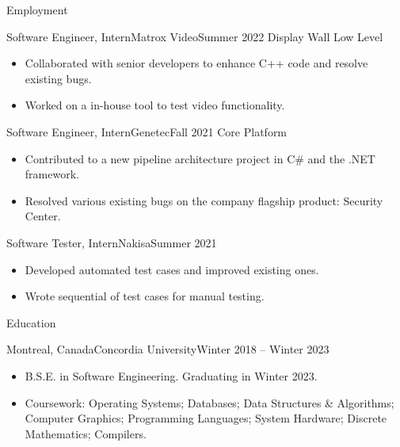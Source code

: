 \documentclass[]{mcdowellcv}
\begin{document}
	\makeheader
	
	\begin{cvsection}{Employment}
		\begin{cvsubsection}{Software Engineer, Intern}{Matrox Video}{Summer 2022}
		    Display Wall Low Level	
			\begin{itemize}
                \item Collaborated with senior developers to enhance C++ code and resolve existing bugs.
                \item Worked on a in-house tool to test video functionality.
			\end{itemize}
		\end{cvsubsection}
		
		\begin{cvsubsection}{Software Engineer, Intern}{Genetec}{Fall 2021}	
            Core Platform
			\begin{itemize}
                \item Contributed to a new pipeline architecture project in C\# and the .NET framework.
                \item Resolved various existing bugs on the company flagship product: Security Center.
			\end{itemize}
		\end{cvsubsection}
		
		\begin{cvsubsection}{Software Tester, Intern}{Nakisa}{Summer 2021}		
			\begin{itemize}
                \item Developed automated test cases and improved existing ones.
                \item Wrote sequential of test cases for manual testing.
			\end{itemize}
		\end{cvsubsection}
	\end{cvsection}
	
	\begin{cvsection}{Education}
		\begin{cvsubsection}{Montreal, Canada}{Concordia University}{Winter 2018 -- Winter 2023}
			\begin{itemize}
				\item B.S.E. in Software Engineering. Graduating in Winter 2023.
                \item Coursework: Operating Systems; Databases; Data Structures \& Algorithms; Computer Graphics; Programming Languages; System Hardware; Discrete Mathematics; Compilers.
			\end{itemize}
		\end{cvsubsection}
	\end{cvsection}
	
\end{document}
